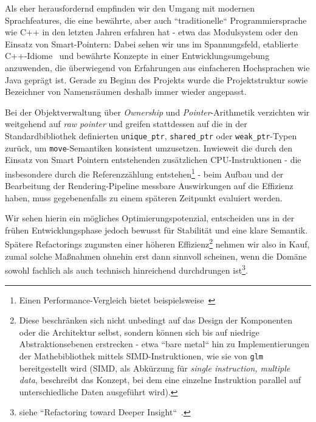 Als eher herausfordernd empfinden wir den Umgang mit modernen Sprachfeatures, die eine bewährte, aber auch ``traditionelle`` Programmiersprache wie C++ in den letzten Jahren erfahren hat - etwa das Modulsystem oder den Einsatz von Smart-Pointern: Dabei sehen wir uns im Spannungsfeld, etablierte C++-Idiome~\cite[]{IdiomaticCpp} und bewährte Konzepte in einer Entwicklungsumgebung anzuwenden, die überwiegend von Erfahrungen aus einfacheren Hochsprachen wie Java geprägt ist.
Gerade zu Beginn des Projekts wurde die Projektstruktur sowie Bezeichner von Namensräumen deshalb immer wieder angepasst.\par

Bei der Objektverwaltung über \textit{Ownership} und \textit{Pointer}-Arithmetik verzichten wir weitgehend auf \textit{raw pointer} und greifen stattdessen auf die in der Standardbibliothek definierten \texttt{unique\_ptr}, \texttt{shared\_ptr} oder \texttt{weak\_ptr}-Typen zurück, um \texttt{move}-Semantiken konsistent umzusetzen.
Inwieweit die durch den Einsatz von Smart Pointern entstehenden zusätzlichen CPU-Instruktionen - die insbesondere durch die Referenzzählung entstehen\footnote{Einen Performance-Vergleich bietet beispielsweise~\cite[]{Val25}} - beim Aufbau und der Bearbeitung der Rendering-Pipeline messbare Auswirkungen auf die Effizienz haben, muss gegebenenfalls zu einem späteren Zeitpunkt evaluiert werden.\par

Wir sehen hierin ein mögliches Optimierungspotenzial, entscheiden uns in der frühen Entwicklungsphase jedoch bewusst für Stabilität und eine klare Semantik.
Spätere  Refactorings zugunsten einer höheren Effizienz\footnote{
Diese beschränken sich nicht unbedingt auf das Design der Komponenten oder die Architektur selbst, sondern können sich bis auf niedrige Abstraktionsebenen erstrecken - etwa ``bare metal`` hin zu Implementierungen der Mathebibliothek mittels SIMD-Instruktionen, wie sie von \texttt{glm}~\cite[]{glmSimd} bereitgestellt wird (SIMD, als Abkürzung für \textit{single instruction, multiple data}, beschreibt das Konzept, bei dem eine einzelne Instruktion parallel auf unterschiedliche Daten ausgeführt wird).
} nehmen wir also in Kauf, zumal solche Maßnahmen ohnehin erst dann sinnvoll scheinen, wenn die Domäne sowohl fachlich als auch technisch hinreichend durchdrungen ist\footnote{
   siehe ``Refactoring toward Deeper Insight``~\cite[]{Eva03}.
}.\par


